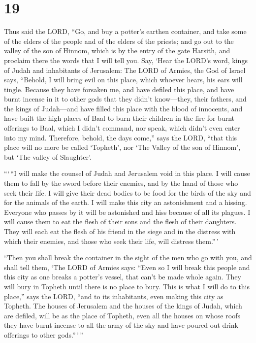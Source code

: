 \hypertarget{section-18}{%
\section{19}\label{section-18}}

 Thus said the LORD, ``Go, and buy a potter's earthen
container, and take some of the elders of the people and of the elders
of the priests;  and go out to the valley of the son of
Hinnom, which is by the entry of the gate Harsith, and proclaim there
the words that I will tell you.  Say, `Hear the LORD's
word, kings of Judah and inhabitants of Jerusalem: The LORD of Armies,
the God of Israel says, ``Behold, I will bring evil on this place, which
whoever hears, his ears will tingle.  Because they have
forsaken me, and have defiled this place, and have burnt incense in it
to other gods that they didn't know---they, their fathers, and the kings
of Judah---and have filled this place with the blood of innocents,
 and have built the high places of Baal to burn their
children in the fire for burnt offerings to Baal, which I didn't
command, nor speak, which didn't even enter into my mind. 
Therefore, behold, the days come,'' says the LORD, ``that this place
will no more be called `Topheth', nor `The Valley of the son of Hinnom',
but `The valley of Slaughter'.

 ```\,``I will make the counsel of Judah and Jerusalem
void in this place. I will cause them to fall by the sword before their
enemies, and by the hand of those who seek their life. I will give their
dead bodies to be food for the birds of the sky and for the animals of
the earth.  I will make this city an astonishment and a
hissing. Everyone who passes by it will be astonished and hiss because
of all its plagues.  I will cause them to eat the flesh of
their sons and the flesh of their daughters. They will each eat the
flesh of his friend in the siege and in the distress with which their
enemies, and those who seek their life, will distress them.''\,'

 ``Then you shall break the container in the sight of the
men who go with you,  and shall tell them, `The LORD of
Armies says: ``Even so I will break this people and this city as one
breaks a potter's vessel, that can't be made whole again. They will bury
in Topheth until there is no place to bury.  This is what
I will do to this place,'' says the LORD, ``and to its inhabitants, even
making this city as Topheth.  The houses of Jerusalem and
the houses of the kings of Judah, which are defiled, will be as the
place of Topheth, even all the houses on whose roofs they have burnt
incense to all the army of the sky and have poured out drink offerings
to other gods.''\,'\,''

